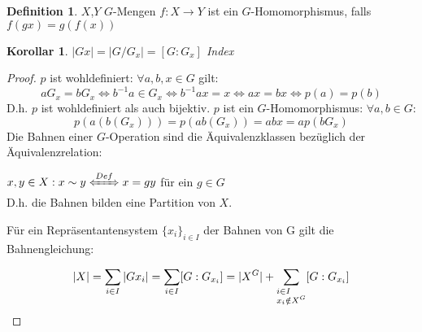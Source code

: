 \documentclass[12pt]{scrartcl}%
\newtheorem{kor}{Korollar}
\theoremstyle{definition}
\newtheorem*{defn}{Definition}
\theoremstyle{remark}
\begin{document}
	\begin{defn}
	$X$,$Y$ $G$-Mengen $f: X \rightarrow Y$ ist ein $G$-Homomorphismus, falls $f(gx)=g(f(x))$
	\end{defn}
	
	\begin{kor}
	$|Gx|=|G/G_x|=[G:G_x]$ Index
	\end{kor}
	
	\begin{proof}
	$p$ ist wohldefiniert: $\forall a,b,x \in G$ gilt:
	$$aG_x=bG_x \Leftrightarrow b^{-1}a \in G_x \Leftrightarrow b^{-1}ax=x \Leftrightarrow ax=bx \Leftrightarrow p(a)=p(b)$$
	D.h. $p$ ist wohldefiniert als auch bijektiv.
	$p$ ist ein $G$-Homomorphismus: $\forall a,b \in G$:
	$$p(a(b(G_x)))=p(ab(G_x))=abx=ap(bG_x)$$
	Die Bahnen einer $G$-Operation sind die \"Aquivalenzklassen bezüglich der \"Aquivalenzrelation:
	
	$x,y \in X : x \sim y \xLeftrightarrow{Def} x=gy$ f\"ur ein $g\in G$\\
	D.h. die Bahnen bilden eine Partition von $X$.
	
	F\"ur ein Repräsentantensystem $\{ x_i\}_{i\in I}$ der Bahnen von G gilt die Bahnengleichung:

	$$|X|=\sum\limits_{\begin{subarray}{1}i \in I\end{subarray}}|Gx_i|=\sum\limits_{\begin{subarray}{1}i \in I\end{subarray}}[G:G_{x_i}]=|X^G|+\sum\limits_{\begin{subarray}{1}i \in I\\ x_i \notin X^G\end{subarray}}[G:G_{x_i}]$$
	
	
	\end{proof}
	
\newpage
\end{document}
